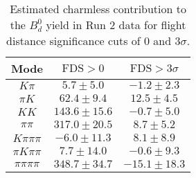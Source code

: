 \begin{table}[h]
  \centering
  \begin{tabular}{ccc}
      \toprule
      Mode & $\mathrm{FDS} > 0$ & $\mathrm{FDS} > 3\sigma$ \\
      \midrule
      $K\pi$ & $5.7 \pm 5.0$ & $-1.2 \pm 2.3$ \\
      $\pi K$ & $62.4 \pm 9.4$ & $12.5 \pm 4.5$ \\
      $KK$ & $143.6 \pm 15.6$ & $-0.7 \pm 5.0$ \\
      $\pi\pi$ & $317.0 \pm 20.5$ & $8.7 \pm 5.2$ \\
      $K\pi\pi\pi$ & $-6.0 \pm 11.3$ & $8.1 \pm 8.9$ \\
      $\pi K\pi\pi$ & $7.7 \pm 14.0$ & $-0.6 \pm 9.3$ \\
      $\pi\pi\pi\pi$ & $348.7 \pm 34.7$ & $-15.1 \pm 18.3$ \\
      \bottomrule
  \end{tabular}
  \caption{\small Estimated charmless contribution to the $B^{0}_{d}$ yield in Run 2 data for flight distance significance cuts of 0  and $3\sigma$.}
\label{tab:charmless_yields_Bd_run_2}
\end{table}
